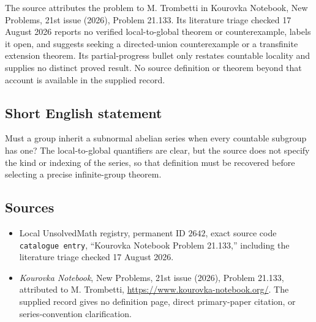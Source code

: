 \documentclass[11pt]{article}
\begin{document}
The source attributes the problem to M. Trombetti in Kourovka Notebook, New Problems, 21st issue (2026), Problem 21.133. Its literature triage checked 17 August 2026 reports no verified local-to-global theorem or counterexample, labels it open, and suggests seeking a directed-union counterexample or a transfinite extension theorem. Its partial-progress bullet only restates countable locality and supplies no distinct proved result. No source definition or theorem beyond that account is available in the supplied record.
\subsection{Short English statement}
Must a group inherit a subnormal abelian series when every countable subgroup has one? The local-to-global quantifiers are clear, but the source does not specify the kind or indexing of the series, so that definition must be recovered before selecting a precise infinite-group theorem.
\subsection{Sources}
\begin{itemize}
\item Local UnsolvedMath registry, permanent ID $2642$, exact source code \texttt{catalogue entry}, ``Kourovka Notebook Problem 21.133,'' including the literature triage checked 17 August 2026.
\item \emph{Kourovka Notebook}, New Problems, 21st issue (2026), Problem 21.133, attributed to M. Trombetti, \url{https://www.kourovka-notebook.org/}. The supplied record gives no definition page, direct primary-paper citation, or series-convention clarification.
\end{itemize}
\end{document}
